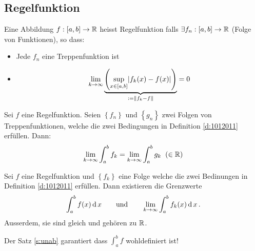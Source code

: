 \subsection{Regelfunktion}
\begin{Def}\label{d:1012011}
  Eine Abbildung $f:[a,b]\to\mathbb{R}$ heisst Regelfunktion falls 
$\exists f_n:[a,b]\to\mathbb{R}$ (Folge von Funktionen), so dass:
  \begin{itemize}
    \item Jede $f_n$ eine Treppenfunktion ist
    \item
      \[\displaystyle\lim_{k\rightarrow\infty}\underbrace{\left( \sup_{x\in[a,b]}\mathopen| f_k (x)-f (x) \mathclose| \right)}_{:=\left\| f_k-f \right\|}=0\]
  \end{itemize}
\end{Def}
\begin{Sat}\label{s:unab}
  Sei $f$ eine Regelfunktion. Seien $\left\{ f_n \right\}$ und $\left\{ g_n \right\}$ zwei Folgen von Treppenfunktionen, welche die zwei Bedingungen in Definition \ref{d:1012011} erfüllen. Dann:
  \[\displaystyle\lim_{k\rightarrow\infty}\int_a^bf_k=\displaystyle\lim_{k\rightarrow\infty}\int_a^bg_k\hspace{2mm}(\in\mathbb{R})\]
\end{Sat}
\begin{Def}
  Sei $f$ eine Regelfunktion und $\left\{ f_k \right\}$ eine Folge welche die 
zwei Bedinungen in Definition \ref{d:1012011} erf\"ullen. Dann existieren die Grenzwerte
\[\int_a^b f(x)\operatorname{d} x \qquad \mbox{und} \qquad \displaystyle\lim_{k\rightarrow\infty}\int_a^bf_k(x)\operatorname{d} x\, .\] Ausserdem, sie sind gleich und geh\"oren zu $\mathbb{R}$.
\end{Def}

Der Satz \ref{s:unab} garantiert dass $\int_a^b f$ wohldefiniert ist!

